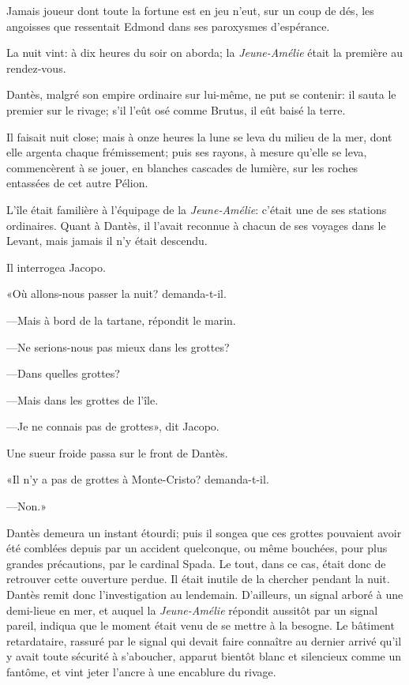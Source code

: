 Jamais joueur dont toute la fortune est en jeu n'eut, sur un coup de dés, les angoisses que ressentait Edmond dans ses paroxysmes d'espérance.

La nuit vint: à dix heures du soir on aborda; la \textit{Jeune-Amélie} était la première au rendez-vous.

Dantès, malgré son empire ordinaire sur lui-même, ne put se contenir: il sauta le premier sur le rivage; s'il l'eût osé comme Brutus, il eût baisé la terre.

Il faisait nuit close; mais à onze heures la lune se leva du milieu de la mer, dont elle argenta chaque frémissement; puis ses rayons, à mesure qu'elle se leva, commencèrent à se jouer, en blanches cascades de lumière, sur les roches entassées de cet autre Pélion.

L'île était familière à l'équipage de la \textit{Jeune-Amélie}: c'était une de ses stations ordinaires. Quant à Dantès, il l'avait reconnue à chacun de ses voyages dans le Levant, mais jamais il n'y était descendu.

Il interrogea Jacopo.

«Où allons-nous passer la nuit? demanda-t-il.

—Mais à bord de la tartane, répondit le marin.

—Ne serions-nous pas mieux dans les grottes?

—Dans quelles grottes?

—Mais dans les grottes de l'île.

—Je ne connais pas de grottes», dit Jacopo.

Une sueur froide passa sur le front de Dantès.

«Il n'y a pas de grottes à Monte-Cristo? demanda-t-il.

—Non.»

Dantès demeura un instant étourdi; puis il songea que ces grottes pouvaient avoir été comblées depuis par un accident quelconque, ou même bouchées, pour plus grandes précautions, par le cardinal Spada. Le tout, dans ce cas, était donc de retrouver cette ouverture perdue. Il était inutile de la chercher pendant la nuit. Dantès remit donc l'investigation au lendemain. D'ailleurs, un signal arboré à une demi-lieue en mer, et auquel la \textit{Jeune-Amélie} répondit aussitôt par un signal pareil, indiqua que le moment était venu de se mettre à la besogne. Le bâtiment retardataire, rassuré par le signal qui devait faire connaître au dernier arrivé qu'il y avait toute sécurité à s'aboucher, apparut bientôt blanc et silencieux comme un fantôme, et vint jeter l'ancre à une encablure du rivage.

